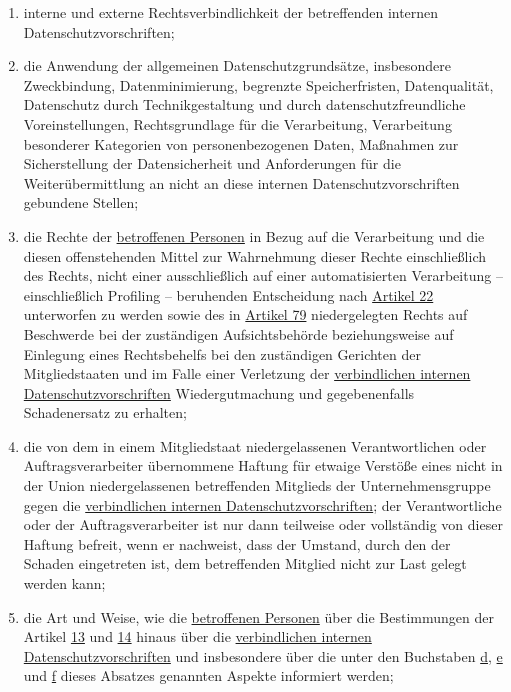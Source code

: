 \begin{enumerate}
\begin{enumerate}
    \item interne und externe Rechtsverbindlichkeit der betreffenden internen Datenschutzvorschriften;
    \label{itm:47-2c}

    \item die Anwendung der allgemeinen Datenschutzgrundsätze, insbesondere Zweckbindung, Datenminimierung, begrenzte
     Speicherfristen, Datenqualität, Datenschutz durch Technikgestaltung und durch datenschutzfreundliche
     Voreinstellungen, Rechtsgrundlage für die Verarbeitung, Verarbeitung besonderer Kategorien von personenbezogenen
     Daten, Maßnahmen zur Sicherstellung der Datensicherheit und Anforderungen für die Weiterübermittlung an nicht an
     diese internen Datenschutzvorschriften gebundene Stellen;
    \label{itm:47-2d}

    \item die Rechte der \hyperref[itm:04-1]{betroffenen Personen} in Bezug auf die Verarbeitung und die diesen offenstehenden Mittel zur
     Wahrnehmung dieser Rechte einschließlich des Rechts, nicht einer ausschließlich auf einer automatisierten
     Verarbeitung -- einschließlich Profiling -- beruhenden Entscheidung nach \hyperref[ch:22]{Artikel 22} unterworfen
     zu werden sowie des in \hyperref[ch:79]{Artikel 79} niedergelegten Rechts auf Beschwerde bei der zuständigen
     Aufsichtsbehörde beziehungsweise auf Einlegung eines Rechtsbehelfs bei den zuständigen Gerichten der
     Mitgliedstaaten und im Falle einer Verletzung der \hyperref[itm:04-20]{verbindlichen internen Datenschutzvorschriften} Wiedergutmachung
     und gegebenenfalls Schadenersatz zu erhalten;
    \label{itm:47-2e}

    \item die von dem in einem Mitgliedstaat niedergelassenen Verantwortlichen oder Auftragsverarbeiter übernommene
     Haftung für etwaige Verstöße eines nicht in der Union niedergelassenen betreffenden Mitglieds der
     Unternehmensgruppe gegen die \hyperref[itm:04-20]{verbindlichen internen Datenschutzvorschriften}; der Verantwortliche oder der
     Auftragsverarbeiter ist nur dann teilweise oder vollständig von dieser Haftung befreit, wenn er nachweist, dass
     der Umstand, durch den der Schaden eingetreten ist, dem betreffenden Mitglied nicht zur Last gelegt werden kann;
    \label{itm:47-2f}

    \item die Art und Weise, wie die \hyperref[itm:04-1]{betroffenen Personen} über die Bestimmungen der Artikel \hyperref[ch:13]{13} und
     \hyperref[ch:14]{14} hinaus über die \hyperref[itm:04-20]{verbindlichen internen Datenschutzvorschriften} und insbesondere über die unter
     den Buchstaben \hyperref[itm:47-2d]{d}, \hyperref[itm:47-2e]{e} und \hyperref[itm:47-2f]{f} dieses Absatzes
     genannten Aspekte informiert werden;
    \label{itm:47-2g}


\end{enumerate}
\end{enumerate}
